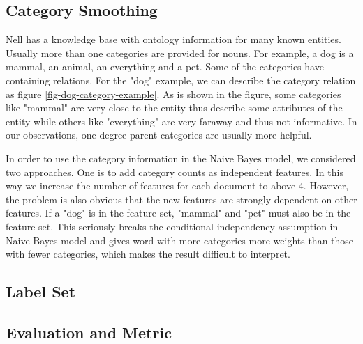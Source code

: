 \subsection{Category Smoothing}

Nell has a knowledge base with ontology information for many known entities. Usually more than one categories are provided for nouns. For example, a dog is a mammal, an animal, an everything and a pet. Some of the categories have containing relations. For the "dog" example, we can describe the category relation as figure \ref{fig-dog-category-example}. As is shown in the figure, some categories like "mammal" are very close to the entity thus describe some attributes of the entity while others like "everything" are very faraway and thus not informative. In our observations, one degree parent categories are usually more helpful.


In order to use the category information in the Naive Bayes model, we considered two approaches. One is to add category counts as independent features. In this way we increase the number of features for each document to above 4. However, the problem is also obvious that the new features are strongly dependent on other features. If a "dog" is in the feature set, "mammal" and "pet" must also be in the feature set. This seriously breaks the conditional independency assumption in Naive Bayes model and gives word with more categories more weights than those with fewer categories, which makes the result difficult to interpret.


\subsection{Label Set}



\subsection{Evaluation and Metric}

